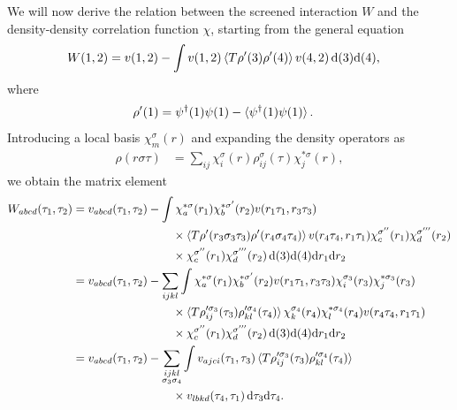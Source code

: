 \documentclass[12pt,a4paper]{scrartcl}
\numberwithin{equation}{section}
\begin{document}
We will now derive the relation between the screened interaction $W$ and the density-density
correlation function $\chi$, starting from the general equation
\begin{align}
W(1,2)
&=v(1,2) - \int v(1,2) \braket{T\rho'(3)\rho'(4)} v(4,2) \, \mathrm{d}(3)\mathrm{d}(4), 
\end{align}
where
\begin{align}
 \rho'(1) &= \psi^{\dagger}(1)\psi(1) - \braket{ \psi^{\dagger}(1)\psi(1) }.
\end{align}
Introducing a local basis $\chi^{\sigma}_m(r)$ and expanding the density operators as
\begin{align}
\rho(r\sigma\tau) &= \sum_{ij} \chi^{\sigma}_i(r) \rho^{\sigma}_{ij}(\tau) \chi^{*\sigma}_j(r),
\end{align}
we obtain the matrix element
\begin{align}
W_{abcd}(\tau_1,\tau_2) 
&= v_{abcd}(\tau_1,\tau_2)  
- \int \chi^{*\sigma}_a(r_1)\chi^{*\sigma'}_b(r_2) v(r_1\tau_1,r_3\tau_3)   \nonumber \\
            & \hspace{3cm} \times \braket{T\rho'(r_3\sigma_3\tau_3)\rho'(r_4\sigma_4\tau_4)}
                            v(r_4\tau_4,r_1\tau_1) \chi^{\sigma''}_c(r_1)\chi^{\sigma'''}_d(r_2) \nonumber \\
            &\hspace{3cm} \times \chi^{\sigma''}_c(r_1)\chi^{\sigma'''}_d(r_2)
                                             \, \mathrm{d}(3)\mathrm{d}(4) \mathrm{d}r_1 \mathrm{d}r_2 \\
%
&= v_{abcd}(\tau_1,\tau_2)  
- \sum_{ijkl}\int \chi^{*\sigma}_a(r_1)\chi^{*\sigma'}_b(r_2)
                                    v(r_1\tau_1,r_3\tau_3) \chi^{\sigma_3}_i(r_3) \chi^{*\sigma_3}_j(r_3) \nonumber\\
               &\hspace{3cm} \times   \braket{T\rho'^{\sigma_3}_{ij}(\tau_3)\rho'^{\sigma_4}_{kl}(\tau_4)}
                            \chi^{\sigma_4}_k(r_4) \chi^{*\sigma_4}_l(r_4)
                            v(r_4\tau_4,r_1\tau_1)                                         \nonumber \\
               &\hspace{3cm} \times  \chi^{\sigma''}_c(r_1)\chi^{\sigma'''}_d(r_2)
                                                        \, \mathrm{d}(3)\mathrm{d}(4) \mathrm{d}r_1 \mathrm{d}r_2 \\
%
&= v_{abcd}(\tau_1,\tau_2)  
- \sum_{\substack{ijkl\\ \sigma_3\sigma_4}}\int v_{ajci}(\tau_1,\tau_3)  \braket{T\rho'^{\sigma_3}_{ij}(\tau_3)\rho'^{\sigma_4}_{kl}(\tau_4)}    \nonumber\\
               &\hspace{3cm} \times   v_{lbkd}(\tau_4,\tau_1)   \, \mathrm{d}\tau_3 \mathrm{d}\tau_4 .
\end{align}
\end{document}

